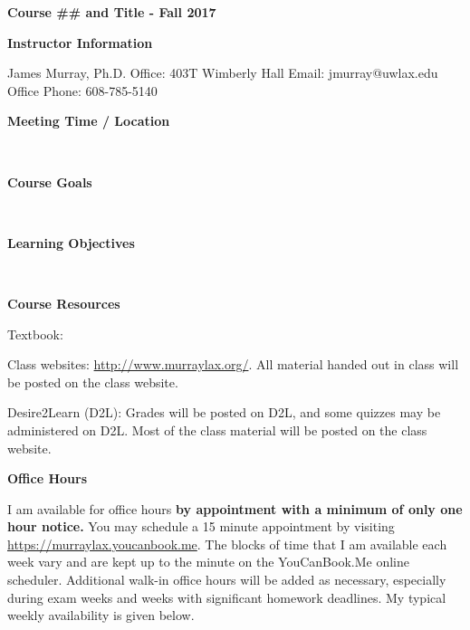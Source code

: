 \documentclass[10pt]{article}
\newcommand{\bulurl}[1]{\url{#1}}
\newcommand{\bd}{\begin{description}}
\newcommand{\ed}{\end{description}}
\newcommand{\toprule}{\par\vspace*{5pt}\noindent{\hrule\hfill}\par\vspace*{1pt}}
\newcommand{\botrule}{\par\noindent{\hrule\hfill}\par}
\begin{document}
\begin{center} 
\textbf{Course \#\# and Title - Fall 2017}\\
\end{center} 

\botrule \textbf{Instructor Information} \toprule
James Murray, Ph.D.\newline
Office: 403T Wimberly Hall\newline
Email: jmurray@uwlax.edu\newline
Office Phone: 608-785-5140 \newline

\botrule \textbf{Meeting Time / Location} \toprule
\ \\

\botrule \textbf{Course Goals} \toprule
\ \\

\botrule \textbf{Learning Objectives} \toprule
\ \\

\botrule \textbf{Course Resources} \toprule
\bd
\item Textbook: 
\item Class websites: \bulurl{http://www.murraylax.org/}.  All material handed out in class will be posted on the class website.  
\item Desire2Learn (D2L):  Grades will be posted on D2L, and some quizzes may be administered on D2L.  Most of the class material will be posted on the class website. \\ 
\ed

\botrule \textbf{Office Hours} \toprule
I am available for office hours \textbf{by appointment with a minimum of only one hour notice.}  You may schedule a 15 minute appointment by visiting \bulurl{https://murraylax.youcanbook.me}.  The blocks of time that I am available each week vary and are kept up to the minute on the YouCanBook.Me online scheduler.  Additional walk-in office hours will be added as necessary, especially during exam weeks and weeks with significant homework deadlines.  My typical weekly availability is given below. \\
\end{document}
